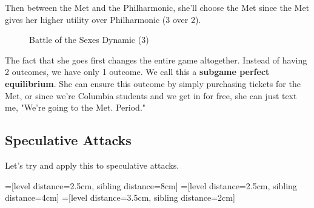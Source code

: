 \documentclass[11pt]{scrartcl}
\begin{document}
Then between the Met and the Philharmonic, she'll choose the Met since the Met gives her higher utility over Philharmonic (3 over 2).

\begin{figure}[H]
\centering
{}
\caption{Battle of the Sexes Dynamic (3)}
\end{figure}

The fact that she goes first changes the entire game altogether. Instead of having 2 outcomes, we have only 1 outcome. We call this a \textbf{subgame perfect equilibrium}. She can ensure this outcome by simply purchasing tickets for the Met, or since we're Columbia students and we get in for free, she can just text me, "We're going to the Met. Period."

\subsection{Speculative Attacks}

Let's try and apply this to speculative attacks.

=[level distance=2.5cm, sibling distance=8cm]
=[level distance=2.5cm, sibling distance=4cm]
=[level distance=3.5cm, sibling distance=2cm]
\end{document}
